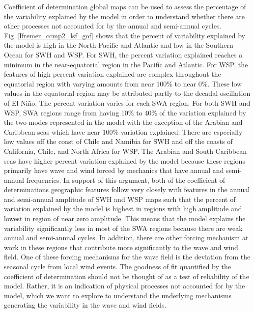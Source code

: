 \documentclass[draft,linenumbers]{agujournal2018}
\begin{document}
Coefficient of determination global maps can be used to assess the percentage of the variability explained by the model in order to understand whether there are other processes not accounted for by the annual and semi-annual cycles. Fig~\ref{Ifremer_ccmp2_lsf_gof} shows that the percent of variability explained by the model is high in the North Pacific and Atlantic and low in the Southern Ocean for SWH and WSP. For SWH, the percent variation explained reaches a minimum in the near-equatorial region in the Pacific and Atlantic. For WSP, the features of high percent variation explained are complex throughout the equatorial region with varying amounts from near 100\% to near 0\%. These low values in the equatorial region may be attributed partly to the decadal oscillation of El Ni\~no. The percent variation varies for each SWA region. For both SWH and WSP, SWA regions range from having 10\% to 40\% of the variation explained by the two modes represented in the model with the exception of the Arabian and Caribbean seas which have near 100\% variation explained. There are especially low values off the coast of Chile and Namibia for SWH and off the coasts of California, Chile, and North Africa for WSP. The Arabian and South Caribbean seas have higher percent variation explained by the model because these regions primarily have wave and wind forced by mechanics that have annual and semi-annual frequencies. In support of this argument, both of the coefficient of determinations geographic features follow very closely with features in the annual and semi-annual amplitude of SWH and WSP maps such that the percent of variation explained by the model is highest in regions with high amplitude and lowest in region of near zero amplitude. This means that the model explains the variability significantly less in most of the SWA regions because there are weak annual and semi-annual cycles. In addition, there are other forcing mechanism at work in these regions that contribute more significantly to the wave and wind field. One of these forcing mechanisms for the wave field is the deviation from the seasonal cycle from local wind events. The goodness of fit quantified by the coefficient of determination should not be thought of as a test of reliability of the model. Rather, it is an indication of physical processes not accounted for by the model, which we want to explore to understand the underlying mechanisms generating the variability in the wave and wind fields. 
\end{document}
